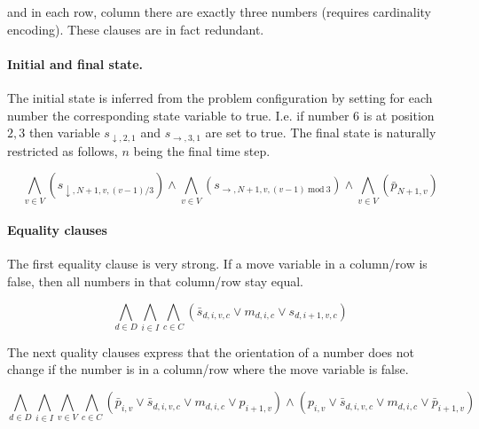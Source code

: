\documentclass[]{llncs}
\newcommand{\TODO}[1]{ {\color{red}{TODO: #1} }}
\begin{document}
and in each row, column there are exactly three numbers (requires cardinality encoding). \TODO{Write cardinality
restriction for state variables.} These clauses are in fact redundant. 

\paragraph{Initial and final state.}
%

The initial state is inferred from the problem configuration by setting for each number the corresponding state variable
to true. I.e. if number $6$ is at position $2,3$ then variable $s_{\downarrow,2,1}$ and $s_{\rightarrow,3,1}$ are set to
true. The final state is naturally restricted as follows, $n$ being the final time step.

\begin{equation}
\bigwedge_{v\in V} (s_{\downarrow,N+1,v,(v-1)/3}) \wedge \bigwedge_{v\in V}  (s_{\rightarrow,N+1,v,(v-1) \mathrm{~mod~} 3}) \wedge
\bigwedge_{v \in V} (\bar p_{N+1,v})
\end{equation}

\paragraph{Equality clauses}
%
The first equality clause is very strong. If a move variable in a column/row is false, then all numbers in that
column/row stay equal. 

\begin{equation}
\bigwedge_{d\in D} \bigwedge_{i\in I} \bigwedge_{c\in C} (\bar s_{d,i,v,c} \vee m_{d,i,c} \vee s_{d,i+1,v,c})
\end{equation}

%
%

The next quality clauses express that the orientation of a number does not change if the number is in a column/row
where the move variable is false. 

\begin{equation}
\bigwedge_{d\in D} \bigwedge_{i\in I} \bigwedge_{v\in V} \bigwedge_{c\in C} (\bar p_{i,v} \vee \bar s_{d,i,v,c} \vee m_{d,i,c} \vee p_{i+1,v})
\wedge (p_{i,v} \vee \bar s_{d,i,v,c} \vee m_{d,i,c} \vee \bar p_{i+1,v})
\end{equation}
\end{document}
